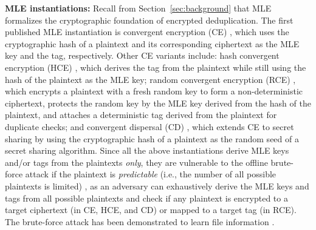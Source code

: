 \documentclass[bachelor]{thesis-uestc}
\begin{document}
\noindent
{\bf MLE instantiations:}  
Recall from Section~\ref{sec:background} that MLE \cite{bellare13a} formalizes the
cryptographic foundation of encrypted deduplication.  The first published MLE
instantiation is convergent encryption (CE) \cite{douceur02}, which uses the
cryptographic hash of a plaintext and its corresponding ciphertext as the
MLE key and the tag, respectively.  Other CE variants include: hash convergent
encryption (HCE) \cite{bellare13a}, which derives the tag from the plaintext
while still using the hash of the plaintext as the MLE key; random convergent
encryption (RCE) \cite{bellare13a}, which encrypts a plaintext with a fresh
random key to form a non-deterministic ciphertext, protects the random key by
the MLE key derived from the hash of the plaintext, and attaches a
deterministic tag derived from the plaintext for duplicate checks; and
convergent dispersal (CD) \cite{li15}, which extends CE to secret sharing by
using the cryptographic hash of a plaintext as the random seed of a secret
sharing algorithm.  Since all the above instantiations derive MLE keys and/or
tags from the plaintexts {\em only}, they are vulnerable to the offline
brute-force attack \cite{bellare13b} if the plaintext is {\em predictable}
(i.e., the number of all possible plaintexts is limited) , as an adversary can
exhaustively derive the MLE keys and tags from all possible plaintexts and
check if any plaintext is encrypted to a target ciphertext (in CE, HCE, and
CD) or mapped to a target tag (in RCE).  The brute-force attack has been
demonstrated to learn file information \cite{ce_attack}.


  
\end{document}
